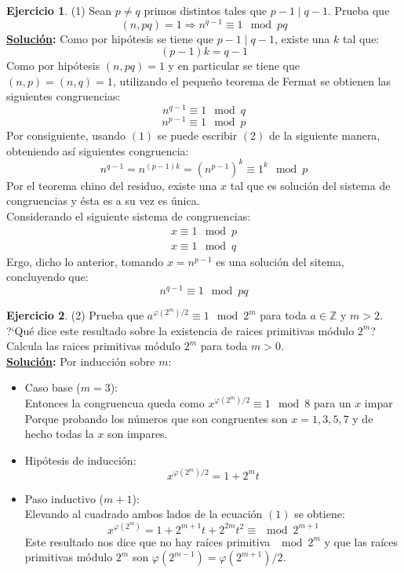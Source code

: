 \documentclass[11pt,letterpaper]{article}
\theoremstyle{definition}\newtheorem{p}{Ejercicio}
\newcommand{\Z}{\mathbb{Z}}
\newcommand{\ent}{\Longrightarrow}
\newcommand{\sol}{\textbf{\underline{Solución}: }} %
\begin{document}
\begin{p}(1)
Sean $p\neq q$ primos distintos tales que $p-1\mid q-1$. Prueba que
    \[
      (n,pq)=1 \ent n^{q-1}\equiv 1\mod pq
    \]
\sol Como por hipótesis se tiene que $p-1\mid q-1$, existe una $k$ tal que:
\begin{equation*}
  (p-1)k = q-1  \tag{1}
\end{equation*}
Como por hipótesis $(n,pq)=1$ y en particular se tiene que $(n,p) = (n,q)=1$, utilizando el
pequeño teorema de Fermat se obtienen las siguientes congruencias:
\begin{equation*}
  n^{q-1} \equiv 1 \mod q \tag{2}
\end{equation*}
\begin{equation*}
  n^{p-1} \equiv 1 \mod p \tag{3}
\end{equation*}
Por consiguiente, usando $(1)$ se puede escribir $(2)$ de la siguiente manera, obteniendo 
así siguientes congruencia:
\begin{equation*}
  n^{q-1} = n^{(p-1)k} = (n^{p-1})^k \equiv 1^k \mod p \tag{4}
\end{equation*}
Por el teorema chino del residuo, existe una $x$ tal que es solución del sistema de congruencias
y ésta es a su vez es única.\\
Considerando el siguiente sistema de congruencias:
\begin{align*}
  x \equiv 1 \mod p\\
  x \equiv 1 \mod q
\end{align*}
Ergo, dicho lo anterior, tomando $x=n^{p-1}$ es una solución del sitema, concluyendo que:
$$n^{q-1} \equiv 1\mod pq$$
\end{p}


\begin{p}(2)
Prueba que $a^{\varphi(2^m)/2}\equiv 1\mod 2^m$ para toda $a\in\Z$ y $m>2$. ?`Qu\'e dice este
resultado sobre la existencia de raices primitivas m\'odulo $2^m$? Calcula las raices primitivas
m\'odulo $2^m$ para toda $m>0$.\\
\sol Por inducción sobre $m$:
\begin{itemize}
  \item Caso base ($m = 3$):\\
  Entonces la congruencua queda como $x^{\varphi(2^m) / 2} \equiv 1 \mod 8$ para un $x$ impar Porque
  probando los números que son congruentes son $x=1,3,5,7$ y de hecho todas la $x$ son impares.
  \item Hipótesis de inducción:
  \[
    x^{\varphi(2^m) / 2} = 1 + 2^m t \tag{1}
  \]
  \item Paso inductivo ($m + 1$):\\
  Elevando al cuadrado ambos lados de la ecuación $(1)$ se obtiene:
  $$x^{\varphi(2^m)} = 1 + 2^{m + 1}t + 2^{2m}t^2 \equiv \mod 2^{m + 1}$$
  Este resultado nos dice que no hay raíces primitiva $\mod 2^m$ y que  las raíces primitivas 
  módulo $2^m$ son $\varphi(2^{m - 1}) = \varphi(2^{m + 1})/2$.
\end{itemize}

\end{p}
\end{document}

